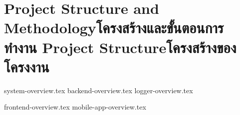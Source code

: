 \chapter{\ifproject%
\ifenglish Project Structure and Methodology\else โครงสร้างและขั้นตอนการทำงาน\fi
\else%
\ifenglish Project Structure\else โครงสร้างของโครงงาน\fi
\fi
}

{system-overview.tex}
{backend-overview.tex}
{logger-overview.tex}

{frontend-overview.tex}
{mobile-app-overview.tex}
